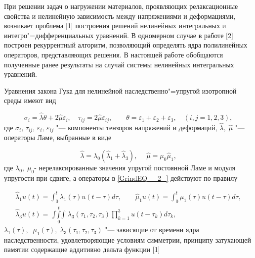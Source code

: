 \vzmscaption



При решении задач о нагружении материалов, проявляющих релаксационные свойства и нелинейную зависимость между напряжениями и деформациями, возникает проблема [1] построения решений  нелинейных интегральных и интегро"=дифференциальных уравнений. В одномерном случае в работе [2] построен рекуррентный алгоритм, позволяющий определять ядра полилинейных операторов, представляющих решения. В настоящей работе обобщаются полученные ранее результаты на случай системы нелинейных интегральных уравнений.

Уравнения закона Гука для нелинейной наследственно"=упругой изотропной среды имеют вид

\begin{equation} \label{GrindEQ__1_} \sigma _{i} =\hat{\lambda }\theta +2\hat{\mu }\varepsilon _{i} ,\quad \tau _{ij} =2\hat{\mu }\varepsilon _{ij} ,\quad \quad \theta =\varepsilon _{1} +\varepsilon _{2} +\varepsilon _{3} ,\quad (i,j=1,2,3), \end{equation}
где $\sigma _{i} ,\, \tau _{ij} ,\, \varepsilon _{i} ,\, \varepsilon _{ij} $ "--- компоненты тензоров напряжений и деформаций, $\hat{\lambda },\; \hat{\mu }$ "--- операторы Ламе, выбранные в виде

\begin{equation} \label{GrindEQ__2_} \hat{\lambda }=\lambda _{0} (\hat{\lambda }_{1} +\hat{\lambda }_{3} ),\quad \; \hat{\mu }=\mu _{0} \hat{\mu }_{1} , \end{equation}
где $\lambda _{0} ,\; \mu _{0} $- нерелаксированные значения упругой постоянной Ламе и модуля упругости при сдвиге, а операторы в \eqref{GrindEQ__2_} действуют по правилу

\begin{equation} \label{GrindEQ__3_} \begin{array}{l} {\hat{\lambda }_{1} u(t)=\int _{0}^{t}\lambda _{1}  (\tau )u(t-\tau )d\tau ,\quad \quad \hat{\mu }_{1} u(t)=\int _{0}^{t}\mu _{1}  (\tau )u(t-\tau )d\tau ,} \\ {\hat{\lambda }_{3} u(t)=\mathop{\int \int \int    }\limits_{0}^{t} \lambda _{3} (\tau _{1} ,\tau _{2} ,\tau _{3} )\prod _{k=1}^{3}u(t-\tau _{k} )d\tau _{k}  ,} \end{array} \end{equation}
$\lambda _{1} (\tau ),\; \; \mu _{1} (\tau ),\; \lambda _{3} (\tau _{1} ,\tau _{2} ,\tau _{3} )$ "--- зависящие от времени ядра наследственности, удовлетворяющие условиям симметрии, принципу затухающей памятии содержащие аддитивно дельта функции [1]

